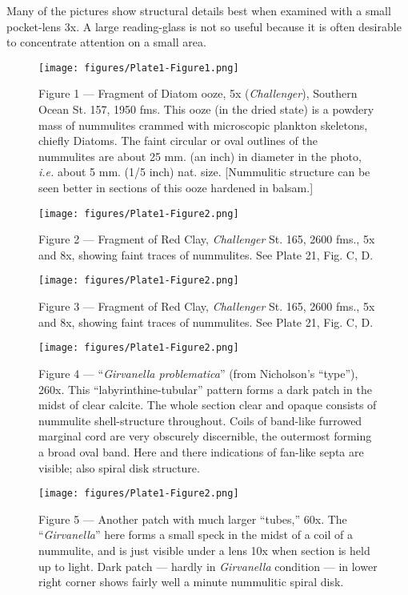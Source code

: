 \documentclass[a4paper, 12pt, oneside]{article}
\begin{document}
Many of the pictures show structural details best when examined with a small pocket-lens 3x. A large reading-glass is not so useful because it is often desirable to concentrate attention on a small area.
\clearpage
\pagestyle{fancy}
\fancyhf{}
\cfoot{\thepage}
\begin{figure}[b]
\texttt{[image: figures/Plate1-Figure1.png]}
\caption{Figure 1 --- Fragment of Diatom ooze, 5x (\emph{Challenger}), Southern Ocean St. 157, 1950 fms. This ooze (in the dried state) is a powdery mass of nummulites crammed with microscopic plankton skeletons, chiefly Diatoms. The faint circular or oval outlines of the nummulites are about 25 mm. (an inch) in diameter in the photo, \emph{i.e.} about 5 mm. (1/5 inch) nat. size. [Nummulitic structure can be seen better in sections of this ooze hardened in balsam.]}
\centering
\end{figure}
\clearpage
\begin{figure}[b]
\texttt{[image: figures/Plate1-Figure2.png]}
\caption{Figure 2 --- Fragment of Red Clay, \emph{Challenger} St. 165, 2600 fms., 5x and 8x, showing faint traces of nummulites. See Plate 21, Fig. C, D.}
\centering
\end{figure}
\clearpage
\begin{figure}[b]
\texttt{[image: figures/Plate1-Figure2.png]}
\caption{Figure 3 --- Fragment of Red Clay, \emph{Challenger} St. 165, 2600 fms., 5x and 8x, showing faint traces of nummulites. See Plate 21, Fig. C, D.}
\centering
\end{figure}
\clearpage
\begin{figure}[b]
\texttt{[image: figures/Plate1-Figure2.png]}
\caption{Figure 4 --- ``\emph{Girvanella problematica}'' (from Nicholson's ``type''), 260x. This ``labyrinthine-tubular'' pattern forms a dark patch in the midst of clear calcite. The whole section clear and opaque consists of nummulite shell-structure throughout. Coils of band-like furrowed marginal cord are very obscurely discernible, the outermost forming a broad oval band. Here and there indications of fan-like septa are visible; also spiral disk structure.}
\centering
\end{figure}
\clearpage
\begin{figure}[b]
\texttt{[image: figures/Plate1-Figure2.png]}
\caption{Figure 5 --- Another patch with much larger ``tubes,'' 60x. The ``\emph{Girvanella}'' here forms a small speck in the midst of a coil of a nummulite, and is just visible under a lens 10x when section is held up to light. Dark patch --- hardly in \emph{Girvanella} condition --- in lower right corner shows fairly well a minute nummulitic spiral disk.}
\centering
\end{figure}
\end{document}

